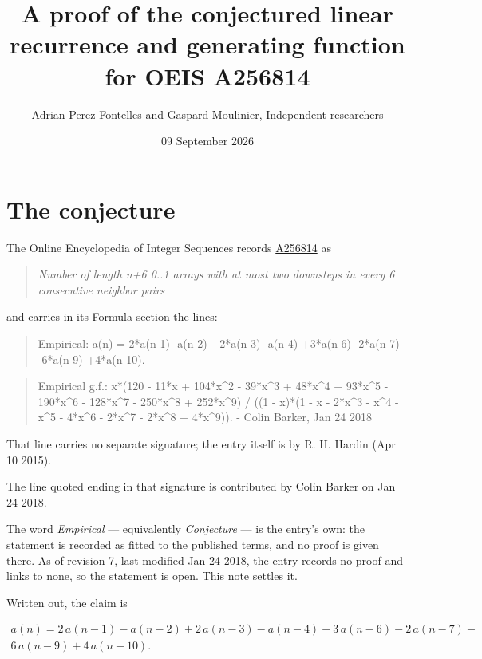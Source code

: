 \documentclass[11pt]{article}
\title{A proof of the conjectured linear recurrence and generating function for OEIS A256814}
\author{Adrian Perez Fontelles and Gaspard Moulinier, Independent researchers}
\date{09 September 2026}
\theoremstyle{definition}
\begin{document}
\maketitle
\section{The conjecture}

The Online Encyclopedia of Integer Sequences records \href{https://oeis.org/A256814}{A256814} as

\begin{quote}\itshape Number of length n+6 0..1 arrays with at most two downsteps in every 6 consecutive neighbor pairs\end{quote}

and carries in its Formula section the lines:

\begin{quote}\ttfamily Empirical: a(n) = 2*a(n-1) -a(n-2) +2*a(n-3) -a(n-4) +3*a(n-6) -2*a(n-7) -6*a(n-9) +4*a(n-10).\end{quote}

\begin{quote}\ttfamily Empirical g.f.: x*(120 - 11*x + 104*x\textasciicircum{}2 - 39*x\textasciicircum{}3 + 48*x\textasciicircum{}4 + 93*x\textasciicircum{}5 - 190*x\textasciicircum{}6 - 128*x\textasciicircum{}7 - 250*x\textasciicircum{}8 + 252*x\textasciicircum{}9) / ((1 - x)*(1 - x - 2*x\textasciicircum{}3 - x\textasciicircum{}4 - x\textasciicircum{}5 - 4*x\textasciicircum{}6 - 2*x\textasciicircum{}7 - 2*x\textasciicircum{}8 + 4*x\textasciicircum{}9)). - Colin Barker, Jan 24 2018\end{quote}

That line carries no separate signature; the entry itself is by R. H. Hardin (Apr 10 2015).

The line quoted ending in that signature is contributed by Colin Barker on Jan 24 2018.

The word {\itshape Empirical} --- equivalently {\itshape Conjecture} --- is the entry's own: the statement is recorded as fitted to the published terms, and no proof is given there. As of revision 7, last modified Jan 24 2018, the entry records no proof and links to none, so the statement is open. This note settles it.

Written out, the claim is

\begin{multline*} a(n) = 2\,a(n-1) - a(n-2) + 2\,a(n-3) - a(n-4) + 3\,a(n-6) - 2\,a(n-7) - \\ 6\,a(n-9) + 4\,a(n-10). \end{multline*}
\end{document}

